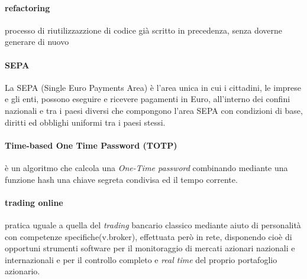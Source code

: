 \paragraph{refactoring}
	processo di riutilizzazzione di codice già scritto in precedenza, senza doverne generare di nuovo
\paragraph{SEPA}
	La SEPA (Single Euro Payments Area) è l’area unica in cui i cittadini, le imprese e gli enti, possono eseguire e ricevere pagamenti in Euro, all’interno dei confini nazionali e tra i paesi diversi che compongono l’area SEPA con condizioni di base, diritti ed obblighi uniformi tra i paesi stessi. 
\paragraph{Time-based One Time Password (TOTP)}
	è un algoritmo che calcola una \emph{One-Time password} combinando mediante una funzione hash una chiave segreta condivisa ed il tempo corrente.
\paragraph{trading online}
	pratica uguale a quella del \emph{trading} bancario classico mediante aiuto di personalità con competenze specifiche(v.broker), effettuata però in rete, disponendo cioè di opportuni strumenti software per il monitoraggio di mercati azionari nazionali e internazionali e  per il controllo completo e \emph{real time} del proprio portafoglio azionario.

